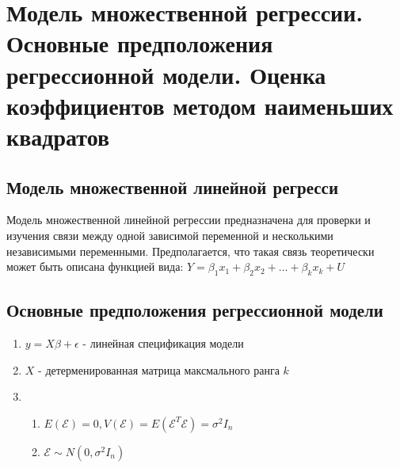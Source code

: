 \documentclass[../document.tex]{subfiles}
\begin{document}
\section{Модель множественной регрессии. Основные предположения регрессионной модели. Оценка коэффициентов методом наименьших квадратов}
	\subsection{Модель множественной линейной регресси}
	\par Модель множественной линейной регрессии предназначена для проверки и изучения связи между одной зависимой переменной и несколькими независимыми  переменными. Предполагается, что такая связь теоретически может быть описана  функцией вида: $Y = \beta_1x_1 + \beta_2x_2 + ... + \beta_kx_k + U$
	
	\subsection{Основные предположения регрессионной модели}
	\begin{enumerate}
		\item $y = X\beta + \epsilon$ - линейная спецификация модели
		\item $X$ - детерменированная матрица максмального ранга $k$
		\item \begin{enumerate}
			\item $E(\mathcal{E}) = 0, V(\mathcal{E}) = E(\mathcal{E}^T\mathcal{E}) = \sigma^2I_n$
			\item $\mathcal{E} \sim N(0, \sigma^2I_n)$
		\end{enumerate}
	\end{enumerate}
	
\end{document}
